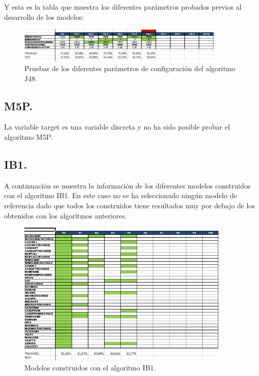 Y esta es la tabla que muestra los diferentes parámetros probados previos al desarrollo de los modelos:

\begin{figure}[H]
\begin{center}
\includegraphics[width=0.9\textwidth]{img/j48-2}
\caption{Pruebas de los diferentes parámetros de configuración del algoritmo J48.}
\end{center}
\end{figure}

\subsection{M5P.}

La variable target es una variable discreta y no ha sido posible probar el algoritmo M5P.

\subsection{IB1.}

A continuación se muestra la información de los diferentes modelos construidos con el algoritmo IB1. En este caso no se ha seleccionado ningún modelo de referencia dado que todos los construidos tiene resultados muy por debajo de los obtenidos con los algoritmos anteriores.

\begin{figure}[H]
\begin{center}
\includegraphics[width=0.9\textwidth]{img/ib1-1}
\caption{Modelos construidos con el algoritmo IB1.}
\end{center}
\end{figure}

